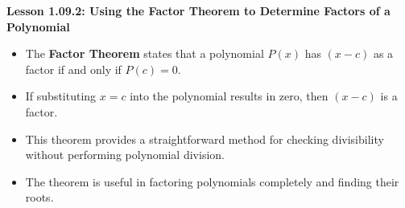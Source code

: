 \begin{center}
\textbf{Lesson 1.09.2: Using the Factor Theorem to Determine Factors of a Polynomial}
\end{center}

\vspace*{-1.5ex}

\begin{itemize}
    \item The \textbf{Factor Theorem} states that a polynomial \( P(x) \) has \( (x - c) \) as a factor if and only if \( P(c) = 0 \).
    \item If substituting \( x = c \) into the polynomial results in zero, then \( (x - c) \) is a factor.
    \item This theorem provides a straightforward method for checking divisibility without performing polynomial division.
    \item The theorem is useful in factoring polynomials completely and finding their roots.
\end{itemize}